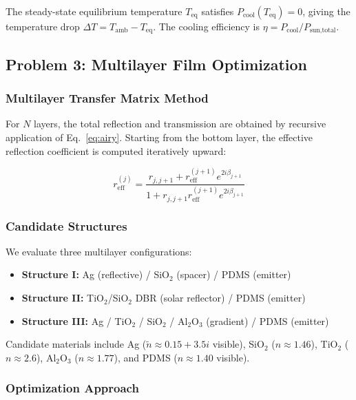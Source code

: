 The steady-state equilibrium temperature $T_{\text{eq}}$ satisfies $P_{\text{cool}}(T_{\text{eq}}) = 0$, giving the temperature drop $\Delta T = T_{\text{amb}} - T_{\text{eq}}$. The cooling efficiency is $\eta = P_{\text{cool}} / P_{\text{sun,total}}$.

\subsection{Problem 3: Multilayer Film Optimization}

\subsubsection{Multilayer Transfer Matrix Method}

For $N$ layers, the total reflection and transmission are obtained by recursive application of Eq.~\eqref{eq:airy}. Starting from the bottom layer, the effective reflection coefficient is computed iteratively upward:

\begin{equation}
  r_{\text{eff}}^{(j)} = \frac{r_{j,j+1} + r_{\text{eff}}^{(j+1)} e^{2i\beta_{j+1}}}{1 + r_{j,j+1} r_{\text{eff}}^{(j+1)} e^{2i\beta_{j+1}}}
  \label{eq:recursive_tmm}
\end{equation}

\subsubsection{Candidate Structures}

We evaluate three multilayer configurations:

\begin{itemize}
  \item \textbf{Structure I:} Ag (reflective) / SiO$_2$ (spacer) / PDMS (emitter)
  \item \textbf{Structure II:} TiO$_2$/SiO$_2$ DBR (solar reflector) / PDMS (emitter)
  \item \textbf{Structure III:} Ag / TiO$_2$ / SiO$_2$ / Al$_2$O$_3$ (gradient) / PDMS (emitter)
\end{itemize}

Candidate materials include Ag ($\tilde{n} \approx 0.15+3.5i$ visible), SiO$_2$ ($n \approx 1.46$), TiO$_2$ ($n \approx 2.6$), Al$_2$O$_3$ ($n \approx 1.77$), and PDMS ($n \approx 1.40$ visible).

\subsubsection{Optimization Approach}

